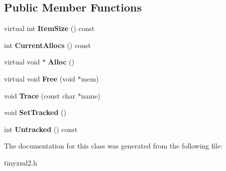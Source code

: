 \subsection*{Public Member Functions}
\begin{DoxyCompactItemize}
\item 
\hypertarget{classtinyxml2_1_1_mem_pool_t_a7ec8778fe99f6e332615a703be0b48bc}{virtual int {\bfseries Item\-Size} () const }\label{classtinyxml2_1_1_mem_pool_t_a7ec8778fe99f6e332615a703be0b48bc}

\item 
\hypertarget{classtinyxml2_1_1_mem_pool_t_a56be11b7db6a7ef00db17088a7769aab}{int {\bfseries Current\-Allocs} () const }\label{classtinyxml2_1_1_mem_pool_t_a56be11b7db6a7ef00db17088a7769aab}

\item 
\hypertarget{classtinyxml2_1_1_mem_pool_t_aa9d785a48ffe6ea1be679bab13464486}{virtual void $\ast$ {\bfseries Alloc} ()}\label{classtinyxml2_1_1_mem_pool_t_aa9d785a48ffe6ea1be679bab13464486}

\item 
\hypertarget{classtinyxml2_1_1_mem_pool_t_a4f1a0c434e9e3d7391e5c16ed4ee8c70}{virtual void {\bfseries Free} (void $\ast$mem)}\label{classtinyxml2_1_1_mem_pool_t_a4f1a0c434e9e3d7391e5c16ed4ee8c70}

\item 
\hypertarget{classtinyxml2_1_1_mem_pool_t_a0bc596f271e0f139822c534238b3f244}{void {\bfseries Trace} (const char $\ast$name)}\label{classtinyxml2_1_1_mem_pool_t_a0bc596f271e0f139822c534238b3f244}

\item 
\hypertarget{classtinyxml2_1_1_mem_pool_t_a7798932414916199a1bc0f9c3f368521}{void {\bfseries Set\-Tracked} ()}\label{classtinyxml2_1_1_mem_pool_t_a7798932414916199a1bc0f9c3f368521}

\item 
\hypertarget{classtinyxml2_1_1_mem_pool_t_a524b90d0edeac41964c06510757dce0f}{int {\bfseries Untracked} () const }\label{classtinyxml2_1_1_mem_pool_t_a524b90d0edeac41964c06510757dce0f}

\end{DoxyCompactItemize}


The documentation for this class was generated from the following file\-:\begin{DoxyCompactItemize}
\item 
tinyxml2.\-h\end{DoxyCompactItemize}
